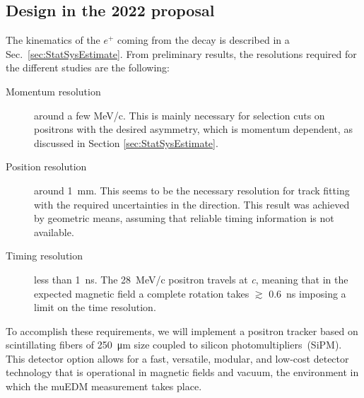 \begin{refsection}
\section{Design in the 2022 proposal}
    The kinematics of the $e^+$ coming from the decay is described in a Sec.~\ref{sec:StatSysEstimate}.
    From preliminary results, the resolutions required for the different studies are the following:
    \begin{description}
        \item[Momentum resolution] around a few MeV/c. This is mainly necessary for selection cuts on positrons with the desired asymmetry, which is momentum dependent, as discussed in Section \ref{sec:StatSysEstimate}.
        \item[Position resolution] around \SI{1}{mm}. This seems to be the necessary resolution for track fitting with the required uncertainties in the direction. 
        This result was achieved by geometric means, assuming that reliable timing information is not available. 
        \item[Timing resolution] less than \SI{1}{ns}. The \SI{28}{MeV/c} positron travels at \textit{c}, meaning that in the expected magnetic field a complete rotation takes $\gtrsim$ \SI{0.6}{ns} imposing a limit on the time resolution. 
    \end{description}
    
    To accomplish these requirements, we will implement a positron tracker based on scintillating fibers of \SI{250}{\micro\meter} size coupled to silicon photomultipliers~(SiPM). 
    This detector option allows for a fast, versatile, modular, and low-cost detector technology that is operational in magnetic fields and vacuum, the environment in which the muEDM measurement takes place.


\end{refsection}
